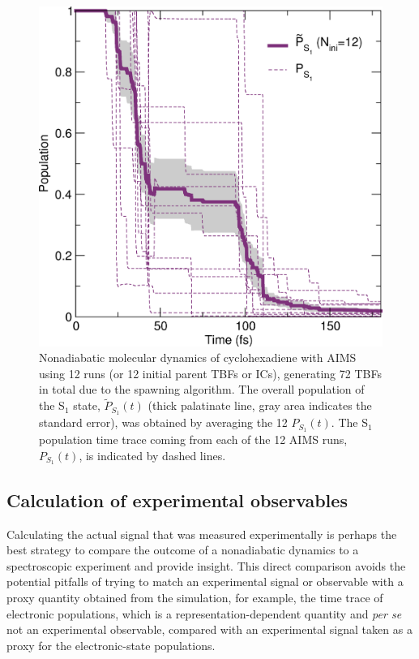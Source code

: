 \documentclass[9pt,bestpractices]{livecoms}
\begin{document}
\begin{figure}[h!]
    \centering
    \includegraphics[width=1.0\linewidth]{./figures/fullpop.png}
    \caption{Nonadiabatic molecular dynamics of cyclohexadiene with AIMS using 12 runs (or 12 initial parent TBFs or ICs), generating 72 TBFs in total due to the spawning algorithm. The overall population of the S$_1$ state, $\tilde{P}_{S_1}(t)$ (thick palatinate line, gray area indicates the standard error), was obtained by averaging the 12 $P_{S_1}(t)$. The S$_1$ population time trace coming from each of the 12 AIMS runs, $P_{S_1}(t)$, is indicated by dashed lines.}
    \label{fig:tbfallic}
\end{figure}


\subsection{Calculation of experimental observables}
\label{sec:analysisandobservables}

Calculating the actual signal that was measured experimentally is perhaps the best strategy to compare the outcome of a nonadiabatic dynamics to a spectroscopic experiment and provide insight. This direct comparison avoids the potential pitfalls of trying to match an experimental signal or observable with a proxy quantity obtained from the simulation, for example, the time trace of electronic populations, which is a representation-dependent quantity and \textit{per se} not an experimental observable, compared with an experimental signal taken as a proxy for the electronic-state populations. 
\end{document}
